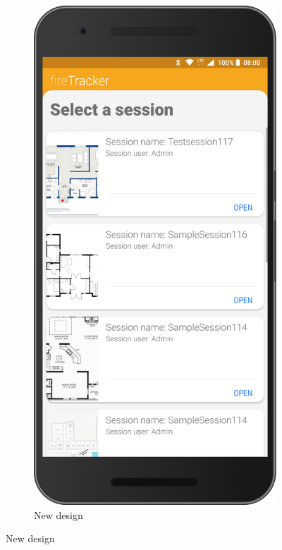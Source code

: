 \documentclass[../Main/thesis.tex]{subfiles}
\begin{document}
\begin{figure}[h]
\begin{subfigure}{0.2\textwidth}
		\includegraphics[width=\textwidth]{../fig/firetracker_app_new_1}
		\caption{New design}
		\label{fig:app-new-design-sessionlist-iteration3}
	\end{subfigure}

\end{figure}
\end{document}
